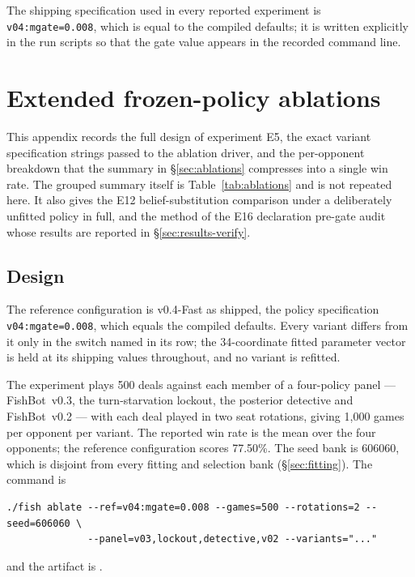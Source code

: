 \documentclass[11pt]{article}
\theoremstyle{definition}
\DeclareRobustCommand{\vfast}{\texorpdfstring{\mbox{v0.4-Fast}}{v0.4-Fast}}
\DeclareRobustCommand{\vthree}{\texorpdfstring{\mbox{FishBot v0.3}}{FishBot v0.3}}
\DeclareRobustCommand{\vtwo}{\texorpdfstring{\mbox{FishBot v0.2}}{FishBot v0.2}}
\newcommand{\numAblRef}{77.50}
\newcommand{\numAblGames}{1{,}000}
\newcommand{\numAblDeals}{500}
\newcommand{\numParams}{34}
\begin{document}
The shipping specification used in every reported experiment is
\texttt{v04:mgate=0.008}, which is equal to the compiled defaults; it is written
explicitly in the run scripts so that the gate value appears in the recorded
command line.
\section{Extended frozen-policy ablations}
\label{app:ablations}

This appendix records the full design of experiment E5, the exact variant
specification strings passed to the ablation driver, and the per-opponent
breakdown that the summary in \S\ref{sec:ablations} compresses into a single
win rate. The grouped summary itself is Table~\ref{tab:ablations} and is not
repeated here. It also gives the E12 belief-substitution comparison under a
deliberately unfitted policy in full, and the method of the E16 declaration
pre-gate audit whose results are reported in \S\ref{sec:results-verify}.

\subsection{Design}
\label{app:abl-design}

The reference configuration is \vfast{} as shipped, the policy specification
\texttt{v04:mgate=0.008}, which equals the compiled defaults. Every variant
differs from it only in the switch named in its row; the \numParams{}-coordinate
fitted parameter vector is held at its shipping values throughout, and no
variant is refitted.

The experiment plays \numAblDeals{} deals against each member of a four-policy
panel --- \vthree{}, the turn-starvation lockout, the posterior detective and
\vtwo{} --- with each deal played in two seat rotations, giving \numAblGames{}
games per opponent per variant. The reported win rate is the mean over the four
opponents; the reference configuration scores \numAblRef\%. The seed bank is
606060, which is disjoint from every fitting and selection bank
(\S\ref{sec:fitting}). The command is

\begin{verbatim}
./fish ablate --ref=v04:mgate=0.008 --games=500 --rotations=2 --seed=606060 \
              --panel=v03,lockout,detective,v02 --variants="..."
\end{verbatim}

and the artifact is .
\end{document}
